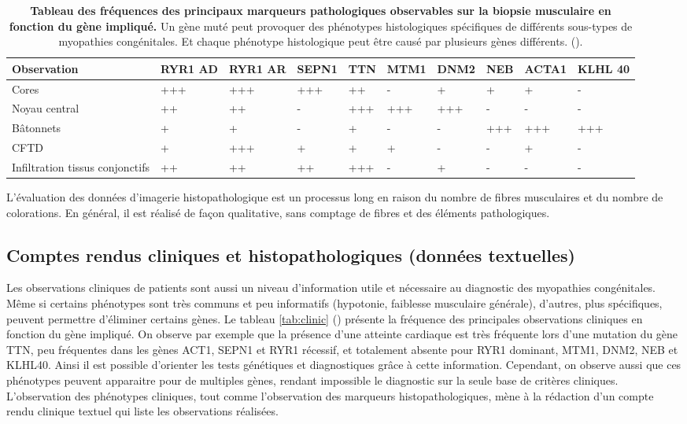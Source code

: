 \begin{table}[htbp]
\begin{tabularx}{\textwidth}{|p{1.8cm}|X|X|X|X|X|X|X|X|X|}
 \hline
\textbf{Observation} & \textbf{RYR1 AD} & \textbf{RYR1 AR} & \textbf{SEPN1} & \textbf{TTN} & \textbf{MTM1} & \textbf{DNM2} & \textbf{NEB} & \textbf{ACTA1} & \textbf{KLHL 40} \\
\hline
Cores & +++ & +++ & +++ & ++ & - & + & + & + & - \\
\hline
Noyau central & ++ & ++ & - & +++ & +++ & +++ & - & - & - \\
\hline
Bâtonnets & + & + & - & + & - & - & +++ & +++ & +++ \\
\hline
CFTD & + & +++ & + & + & + & - & - & + & - \\
\hline
Infiltration tissus conjonctifs & ++ & ++ & ++ & +++ & - & + & - & - & - \\
\hline
\end{tabularx}
\caption[Tableau des fréquences des principaux marqueurs pathologiques en biopsie musculaire.]{\textbf{Tableau des fréquences des principaux marqueurs pathologiques observables sur la biopsie musculaire en fonction du gène impliqué.} Un gène muté peut provoquer des phénotypes histologiques spécifiques de différents sous-types de myopathies congénitales. Et chaque phénotype histologique peut être causé par plusieurs gènes différents. (\cite{jungbluth_congenital_2018}).} 
\label{tab:histopath}
\end{table}

L'évaluation des données d'imagerie histopathologique est un processus long en raison du nombre de fibres musculaires et du nombre de colorations. En général, il est réalisé de façon qualitative, sans comptage de fibres et des éléments pathologiques.

\subsection{Comptes rendus cliniques et histopathologiques (données textuelles) }
Les observations cliniques de patients sont aussi un niveau d'information utile et nécessaire au diagnostic des myopathies congénitales. Même si certains phénotypes sont très communs et peu informatifs (hypotonie, faiblesse musculaire générale), d'autres, plus spécifiques, peuvent permettre d'éliminer certains gènes. Le tableau \ref{tab:clinic} (\cite{jungbluth_congenital_2018}) présente la fréquence des principales observations cliniques en fonction du gène impliqué. On observe par exemple que la présence d'une atteinte cardiaque est très fréquente lors d'une mutation du gène TTN, peu fréquentes dans les gènes ACT1, SEPN1 et RYR1 récessif, et totalement absente pour RYR1 dominant, MTM1, DNM2, NEB et KLHL40. Ainsi il est possible d'orienter les tests génétiques et diagnostiques grâce à cette information. Cependant, on observe aussi que ces phénotypes peuvent apparaitre pour de multiples gènes, rendant impossible le diagnostic sur la seule base de critères cliniques. L'observation des phénotypes cliniques, tout comme l'observation des marqueurs histopathologiques, mène à la rédaction d'un compte rendu clinique textuel qui liste les observations réalisées.

